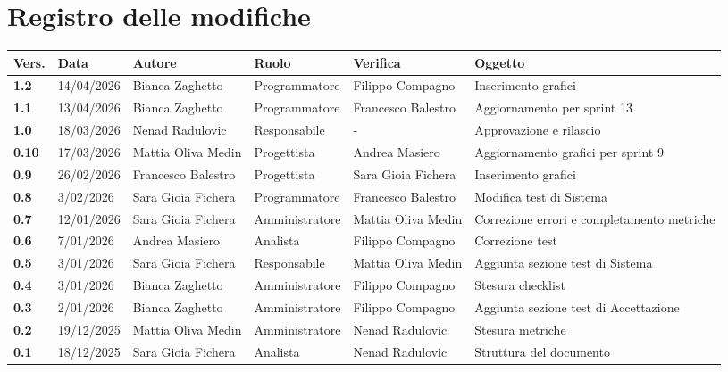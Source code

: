\documentclass[a4paper,12pt]{article}
\begin{document}
    

    \section*{Registro delle modifiche} {
        \begin{table}[h!]
                \begin{tabularx}{\textwidth}{|l|l|l|l|L|L|}
                \hline
                \textbf{Vers.} & \textbf{Data} & \textbf{Autore} & \textbf{Ruolo} & \textbf{Verifica} & \textbf{Oggetto} \\
                \hline
                \textbf{1.2} & 14/04/2026 & Bianca Zaghetto & Programmatore & Filippo Compagno & Inserimento grafici\\
                \hline
                \textbf{1.1} & 13/04/2026 & Bianca Zaghetto & Programmatore & Francesco Balestro & Aggiornamento per sprint 13\\
                \hline
                \textbf{1.0} & 18/03/2026 & Nenad Radulovic & Responsabile & - & Approvazione e rilascio\\
                \hline
                \textbf{0.10} & 17/03/2026 & Mattia Oliva Medin & Progettista & Andrea Masiero & Aggiornamento grafici per sprint 9\\
                \hline
                \textbf{0.9} & 26/02/2026 & Francesco Balestro & Progettista & Sara Gioia Fichera & Inserimento grafici\\
                \hline
                \textbf{0.8} & 3/02/2026 & Sara Gioia Fichera & Programmatore & Francesco Balestro & Modifica test di Sistema\\
                \hline
                \textbf{0.7} & 12/01/2026 & Sara Gioia Fichera & Amministratore & Mattia Oliva Medin & Correzione errori e completamento metriche \\
                \hline
                \textbf{0.6} & 7/01/2026 & Andrea Masiero & Analista & Filippo Compagno & Correzione test \\
                \hline
                \textbf{0.5} & 3/01/2026 & Sara Gioia Fichera & Responsabile & Mattia Oliva Medin & Aggiunta sezione test di Sistema \\
                \hline
                \textbf{0.4} & 3/01/2026 & Bianca Zaghetto & Amministratore & Filippo Compagno & Stesura checklist \\
                \hline
                \textbf{0.3} & 2/01/2026 & Bianca Zaghetto & Amministratore & Filippo Compagno & Aggiunta sezione test di Accettazione \\
                \hline
                \textbf{0.2} & 19/12/2025 & Mattia Oliva Medin & Amministratore & Nenad Radulovic & Stesura metriche\\
                \hline
                \textbf{0.1} & 18/12/2025 & Sara Gioia Fichera & Analista & Nenad Radulovic & Struttura del documento \\
                \hline
            \end{tabularx}
        \end{table}
    }
    \newpage
    
\end{document}
